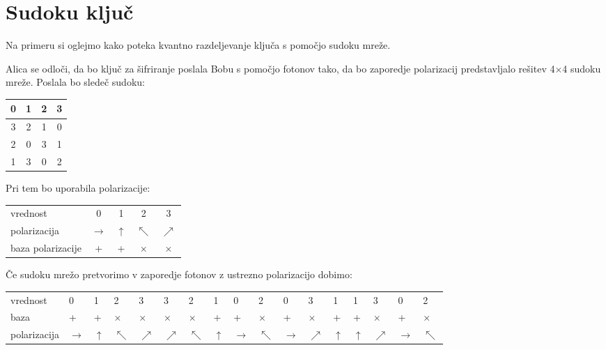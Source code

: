\documentclass[A4paper, 11pt]{article}
\begin{document}

\section{Sudoku ključ}

Na primeru si oglejmo kako poteka kvantno razdeljevanje ključa s pomočjo sudoku mreže.

Alica se odloči, da bo ključ za šifriranje poslala Bobu s pomočjo fotonov tako, da bo zaporedje polarizacij predstavljalo rešitev 4$\times$4 sudoku mreže. Poslala bo sledeč sudoku:

\begin{center}
\begin{tabular}{| c | c || c | c |}
\hline
0 & 1 & 2 & 3\\
\hline
3 & 2 & 1 & 0\\
\hline
\hline
2 & 0 & 3 & 1\\
\hline
1 & 3 & 0 & 2\\
\hline
\end{tabular}
\end{center}

Pri tem bo uporabila polarizacije:

\begin{center}
\begin{tabular}{l c c c c}
vrednost & 0 & 1 & 2 & 3\\
polarizacija & $\rightarrow$ & $\uparrow$ & $\nwarrow$ & $\nearrow$\\
baza polarizacije & + & + & $\times$ & $\times$\\
\end{tabular}
\end{center}

Če sudoku mrežo pretvorimo v zaporedje fotonov z ustrezno polarizacijo dobimo:

\begin{center}
\begin{tabular}{l m{0.2 cm} m{0.2 cm} m{0.2 cm} m{0.2 cm} m{0.2 cm} m{0.2 cm} m{0.2 cm} m{0.2 cm} m{0.2 cm} m{0.2 cm} m{0.2 cm} m{0.2 cm} m{0.2 cm} m{0.2 cm} m{0.2 cm} m{0.2 cm}}
vrednost & 0 & 1 & 2 & 3 & 3 & 2 & 1 & 0 & 2 & 0 & 3 & 1 & 1 & 3 & 0 & 2\\
baza & + & + & $\times$ & $\times$ & $\times$ & $\times$ & + & + & $\times$ & + & $\times$ & + & + & $\times$ & + & $\times$\\
polarizacija & $\rightarrow$ & $\uparrow$ & $\nwarrow$ & $\nearrow$ & $\nearrow$ & $\nwarrow$ & $\uparrow$ & $\rightarrow$ & $\nwarrow$ & $\rightarrow$ & $\nearrow$ & $\uparrow$ & $\uparrow$ & $\nearrow$ & $\rightarrow$ & $\nwarrow$
\end{tabular}
\end{center}
\end{document}
